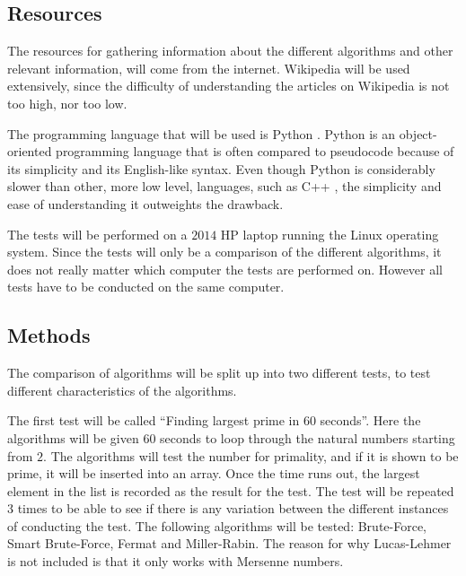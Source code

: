 \documentclass[main.tex]{subfiles}
\begin{document}
\subsection{Resources}
The resources for gathering information about the different algorithms and other
relevant information, will come from the internet. Wikipedia \cite{wikipedia}
will be used extensively, since the difficulty of understanding the articles on
Wikipedia is not too high, nor too low. \newline

The programming language that will be used is Python \cite{python}. Python is an
object-oriented programming language that is often compared to pseudocode
because of its simplicity and its English-like syntax. Even though Python is
considerably slower \cite{pythonvscpp} than other, more low level, languages,
such as C++ \cite{cpp}, the simplicity and ease of understanding it outweights
the drawback. \newline

The tests will be performed on a $2014$ HP laptop running the Linux operating
system. Since the tests will only be a comparison of the different algorithms,
it does not really matter which computer the tests are performed on. However all
tests have to be conducted on the same computer.

\subsection{Methods}
The comparison of algorithms will be split up into two different tests, to test
different characteristics of the algorithms. \newline

The first test will be called ``Finding largest prime in 60 seconds''. Here
the algorithms will be given $60$ seconds to loop through the natural numbers
starting from $2$. The algorithms will test the number for primality, and if it
is shown to be prime, it will be inserted into an array. Once the time runs out,
the largest element in the list is recorded as the result for the test. The test
will be repeated $3$ times to be able to see if there is any variation between
the different instances of conducting the test. The following algorithms will be
tested: Brute-Force, Smart Brute-Force, Fermat and Miller-Rabin. The reason for
why Lucas-Lehmer is not included is that it only works with Mersenne numbers.
\newline
\end{document}
